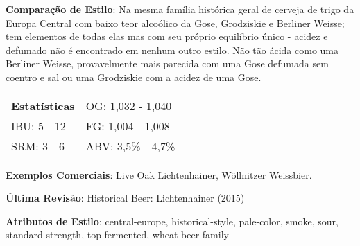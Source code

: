 \textbf{Comparação de Estilo}: Na mesma família histórica geral de cerveja de trigo da Europa Central com baixo teor alcoólico da Gose, Grodziskie e Berliner Weisse; tem elementos de todas elas mas com seu próprio equilíbrio único - acidez e defumado não é encontrado em nenhum outro estilo. Não tão ácida como uma Berliner Weisse, provavelmente mais parecida com uma Gose defumada sem coentro e sal ou uma Grodziskie com a acidez de uma Gose. 

\begin{tabular}{@{}p{35mm}p{35mm}@{}}
  \textbf{Estatísticas} & OG: 1,032 - 1,040  \\
  IBU: 5 - 12  & FG: 1,004 - 1,008  \\
  SRM: 3 - 6 & ABV: 3,5\% - 4,7\%
\end{tabular}

\textbf{Exemplos Comerciais}: Live Oak Lichtenhainer, Wöllnitzer Weissbier.

\textbf{Última Revisão}: Historical Beer: Lichtenhainer (2015)

\textbf{Atributos de Estilo}: central-europe, historical-style, pale-color, smoke, sour, standard-strength, top-fermented, wheat-beer-family
